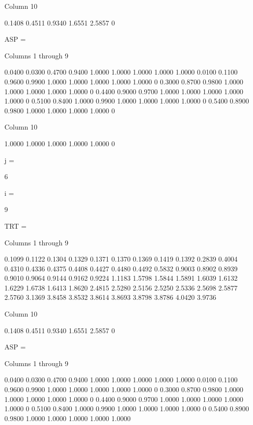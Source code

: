   Column 10

    0.1408
    0.4511
    0.9340
    1.6551
    2.5857
         0


ASP =

  Columns 1 through 9

    0.0400    0.0300    0.4700    0.9400    1.0000    1.0000    1.0000    1.0000    1.0000
    0.0100    0.1100    0.9600    0.9900    1.0000    1.0000    1.0000    1.0000    1.0000
         0    0.3000    0.8700    0.9800    1.0000    1.0000    1.0000    1.0000    1.0000
         0    0.4400    0.9000    0.9700    1.0000    1.0000    1.0000    1.0000    1.0000
         0    0.5100    0.8400    1.0000    0.9900    1.0000    1.0000    1.0000    1.0000
         0    0.5400    0.8900    0.9800    1.0000    1.0000    1.0000    1.0000         0

  Column 10

    1.0000
    1.0000
    1.0000
    1.0000
    1.0000
         0


j =

     6


i =

     9


TRT =

  Columns 1 through 9

    0.1099    0.1122    0.1304    0.1329    0.1371    0.1370    0.1369    0.1419    0.1392
    0.2839    0.4004    0.4310    0.4336    0.4375    0.4408    0.4427    0.4480    0.4492
    0.5832    0.9003    0.8902    0.8939    0.9010    0.9064    0.9144    0.9162    0.9224
    1.1183    1.5798    1.5844    1.5891    1.6039    1.6132    1.6229    1.6738    1.6413
    1.8620    2.4815    2.5280    2.5156    2.5250    2.5336    2.5698    2.5877    2.5760
    3.1369    3.8458    3.8532    3.8614    3.8693    3.8798    3.8786    4.0420    3.9736

  Column 10

    0.1408
    0.4511
    0.9340
    1.6551
    2.5857
         0


ASP =

  Columns 1 through 9

    0.0400    0.0300    0.4700    0.9400    1.0000    1.0000    1.0000    1.0000    1.0000
    0.0100    0.1100    0.9600    0.9900    1.0000    1.0000    1.0000    1.0000    1.0000
         0    0.3000    0.8700    0.9800    1.0000    1.0000    1.0000    1.0000    1.0000
         0    0.4400    0.9000    0.9700    1.0000    1.0000    1.0000    1.0000    1.0000
         0    0.5100    0.8400    1.0000    0.9900    1.0000    1.0000    1.0000    1.0000
         0    0.5400    0.8900    0.9800    1.0000    1.0000    1.0000    1.0000    1.0000

